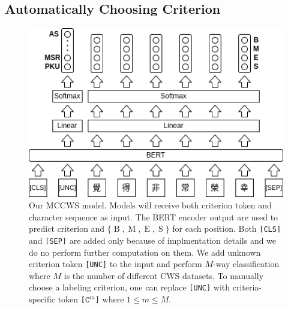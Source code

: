 \documentclass[11pt]{article}
\newcommand{\set}[1]{\lbrace #1 \rbrace}
\newcommand{\CLS}{\texttt{[CLS]}}
\newcommand{\SEP}{\texttt{[SEP]}}
\newcommand{\UNC}{\texttt{[UNC]}}
\newcommand{\Ck}[1]{\texttt{[\(\mathtt{C}^{#1}\)]}}
\newcommand{\BTag}{\operatorname{B}}
\newcommand{\MTag}{\operatorname{M}}
\newcommand{\ETag}{\operatorname{E}}
\newcommand{\STag}{\operatorname{S}}
\newcommand{\TagSet}{\set{\BTag, \MTag, \ETag, \STag}}
\begin{document}
\subsection{Automatically Choosing Criterion}\label{sec:auto}

\begin{figure}[t!]
  \center
  \includegraphics[width=.5\columnwidth]{./pic2.png}
  \caption{Our MCCWS model.
    Models will receive both criterion token and character sequence as input.
    The BERT encoder output are used to predict criterion and \(\TagSet\) for each position.
    Both \CLS{} and \SEP{} are added only because of implmentation details and we do no perform further computation on them.
    We add unknown criterion token \UNC{} to the input and perform \(M\)-way classification where \(M\) is the number of different CWS datasets.
    To manually choose a labeling criterion, one can replace \UNC{} with criteria-specific token \Ck{m} where \(1 \leq m \leq M\).}
  \label{fig:1}
\end{figure}
\end{document}
